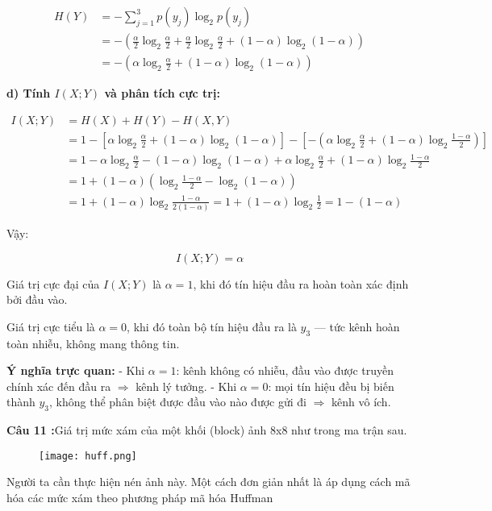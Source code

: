 \documentclass[12pt]{article}
\begin{document}
\[
\begin{aligned}
H(Y) &= - \sum_{j=1}^{3} p(y_j) \log_2 p(y_j) \\
&= - \left( \frac{\alpha}{2} \log_2 \frac{\alpha}{2} + \frac{\alpha}{2} \log_2 \frac{\alpha}{2} + (1 - \alpha) \log_2 (1 - \alpha) \right) \\
&= - \left( \alpha \log_2 \frac{\alpha}{2} + (1 - \alpha) \log_2 (1 - \alpha) \right)
\end{aligned}
\]

\textbf{d) Tính $I(X;Y)$ và phân tích cực trị:}

\[
\begin{aligned}
I(X;Y) &= H(X) + H(Y) - H(X,Y) \\
&= 1 - \left[ \alpha \log_2 \frac{\alpha}{2} + (1 - \alpha) \log_2 (1 - \alpha) \right] - \left[ -\left( \alpha \log_2 \frac{\alpha}{2} + (1 - \alpha) \log_2 \frac{1 - \alpha}{2} \right) \right] \\
&= 1 - \alpha \log_2 \frac{\alpha}{2} - (1 - \alpha) \log_2 (1 - \alpha) + \alpha \log_2 \frac{\alpha}{2} + (1 - \alpha) \log_2 \frac{1 - \alpha}{2} \\
&= 1 + (1 - \alpha) \left( \log_2 \frac{1 - \alpha}{2} - \log_2 (1 - \alpha) \right) \\
&= 1 + (1 - \alpha) \log_2 \frac{1 - \alpha}{2(1 - \alpha)} = 1 + (1 - \alpha) \log_2 \frac{1}{2} = 1 - (1 - \alpha)
\end{aligned}
\]

Vậy:

\[
I(X;Y) = \alpha
\]

Giá trị cực đại của $I(X;Y)$ là $\alpha = 1$, khi đó tín hiệu đầu ra hoàn toàn xác định bởi đầu vào.

Giá trị cực tiểu là $\alpha = 0$, khi đó toàn bộ tín hiệu đầu ra là $y_3$ — tức kênh hoàn toàn nhiễu, không mang thông tin.

\textbf{Ý nghĩa trực quan:}  
- Khi $\alpha = 1$: kênh không có nhiễu, đầu vào được truyền chính xác đến đầu ra $\Rightarrow$ kênh lý tưởng.  
- Khi $\alpha = 0$: mọi tín hiệu đều bị biến thành $y_3$, không thể phân biệt được đầu vào nào được gửi đi $\Rightarrow$ kênh vô ích.


\newpage
\textbf{Câu 11 :}Giá trị mức xám của một khối (block) ảnh 8x8 như trong ma trận sau.

\begin{figure}[h]
    \centering
    \texttt{[image: huff.png]}
    \caption{}
    \label{fig:enter-label}
\end{figure}
Người ta cần thực hiện nén ảnh này. Một cách đơn giản nhất là áp dụng cách mã hóa các mức xám theo phương pháp mã hóa Huffman
\end{document}
